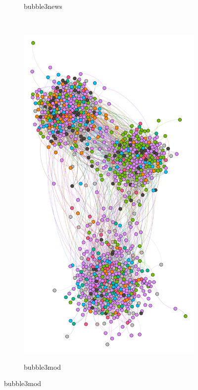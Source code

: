 \begin{figure}
\begin{subfigure}[t]{0.35\textwidth}
    \label{fig:bubble7mod}
    \caption{bubble3news}
  \end{subfigure}
  \\
  \begin{subfigure}[t]{0.25\textwidth}
    \includegraphics[width=\textwidth]{img/dim3_news.pdf}
    \label{fig:bubble3news}
    \caption{bubble3mod}
  \end{subfigure}

\end{figure}
